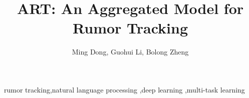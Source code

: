 \documentclass[review]{elsarticle}
\begin{document}
\begin{frontmatter}

\title{ART: An Aggregated Model for Rumor Tracking}

\author{Ming Dong, Guohui Li, Bolong Zheng}
\address{Huazhong University of Science and Technology}




\begin{keyword}
rumor tracking\sep natural language processing \sep deep learning \sep multi-task learning
\end{keyword}

\end{frontmatter}

\linenumbers









\end{document}
